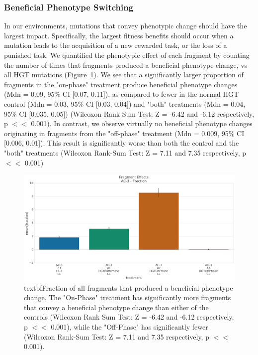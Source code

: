 \documentclass[PhD]{msu-thesis}
\begin{document}
\subsubsection{Beneficial Phenotype Switching}
In our environments, mutations that convey phenotypic change should have the largest impact. Specifically, the largest fitness benefits should occur when a mutation leads to the acquisition of a new rewarded task, or the loss of a punished task.  
We quantified 
the phenotypic effect of each fragment by counting the number of times that fragments produced a beneficial phenotype change, vs all HGT mutations (Figure~\ref{fig:beneficial_fraction_by_cycle_phase_source}). We see that a significantly larger proportion of fragments in the "on-phase" treatment produce beneficial phenotype changes (Mdn = 0.09, 95\% CI [0.07, 0.11]), as compared to fewer in the normal HGT control (Mdn = 0.03, 95\% CI [0.03, 0.04]) and "both" treatments (Mdn = 0.04, 95\% CI [0.035, 0.05]) (Wilcoxon Rank Sum Test: Z = -6.42 and -6.12 respectively, p $<<$ 0.001). In contrast, we observe virtually no beneficial phenotype changes originating in fragments from the "off-phase" treatment (Mdn = 0.009, 95\% CI [0.006, 0.01]). This result is significantly worse than both the control and the "both" treatments (Wilcoxon Rank-Sum Test: Z = 7.11 and 7.35 respectively, p $<<$ 0.001) 

\begin{figure}[h!]
\begin{center}
\includegraphics[width=0.7\columnwidth]{figures/HGT/beneficial_fraction_by_cycle_phase_source.png}
\caption{textbf{Fraction of all fragments that produced a beneficial phenotype change}. The "On-Phase" treatment has significantly more fragments that convey a beneficial phenotype change than either of the controls (Wilcoxon Rank Sum Test: Z = -6.42 and -6.12 respectively, p $<<$ 0.001), while the "Off-Phase" has significantly fewer (Wilcoxon Rank-Sum Test: Z = 7.11 and 7.35 respectively, p $<<$ 0.001).
}\label{fig:beneficial_fraction_by_cycle_phase_source}
\end{center}
\end{figure}
\end{document}
